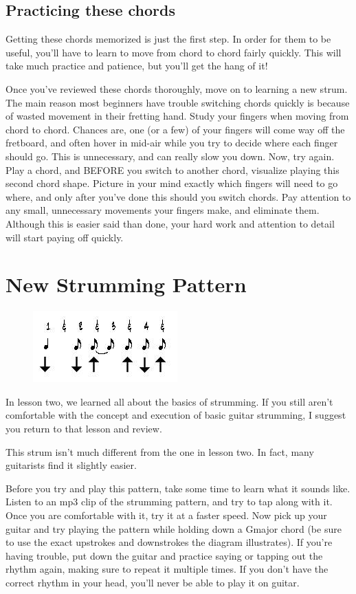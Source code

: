 \subsection{Practicing these chords}

Getting these chords memorized is just the first step. In order for them to be
useful, you'll have to learn to move from chord to chord fairly quickly. This
will take much practice and patience, but you'll get the hang of it!

Once you've reviewed these chords thoroughly, move on to learning a new strum.
The main reason most beginners have trouble switching chords quickly is because
of wasted movement in their fretting hand. Study your fingers when moving from
chord to chord. Chances are, one (or a few) of your fingers will come way off
the fretboard, and often hover in mid-air while you try to decide where each
finger should go. This is unnecessary, and can really slow you down. Now, try
again. Play a chord, and BEFORE you switch to another chord, visualize
playing this second chord shape. Picture in your mind exactly which fingers
will need to go where, and only after you've done this should you switch
chords. Pay attention to any small, unnecessary movements your fingers make,
and eliminate them. Although this is easier said than done, your hard work and
attention to detail will start paying off quickly.

\section{New Strumming Pattern}
\begin{figure}
\includegraphics{partthree/strum3.jpg}
\end{figure}

In lesson two, we learned all about the basics of strumming. If you still
aren't comfortable with the concept and execution of basic guitar strumming, I
suggest you return to that lesson and review.

This strum isn't much different from the one in lesson two. In fact, many
guitarists find it slightly easier.

Before you try and play this pattern, take some time to learn what it sounds
like. Listen to an mp3 clip of the strumming pattern, and try to tap along with
it. Once you are comfortable with it, try it at a faster speed. Now pick up
your guitar and try playing the pattern while holding down a Gmajor chord (be
sure to use the exact upstrokes and downstrokes the diagram illustrates). If
you're having trouble, put down the guitar and practice saying or tapping out
the rhythm again, making sure to repeat it multiple times. If you don't have
the correct rhythm in your head, you'll never be able to play it on guitar.

